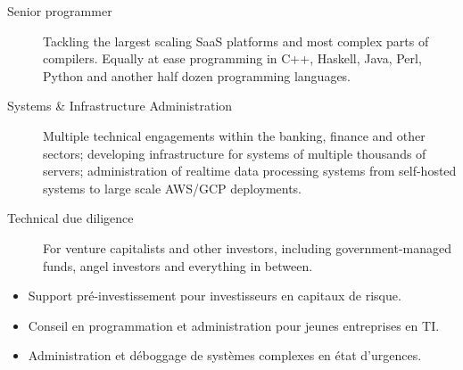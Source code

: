 \vspace{2 mm}

\begin{langen}
\begin{description}%
\item[Senior programmer] Tackling the largest scaling SaaS platforms and most complex parts of compilers. Equally at ease programming in C++, Haskell, Java, Perl, Python and another half dozen programming languages.
\item[Systems \& Infrastructure Administration] Multiple technical engagements within the banking, finance and other sectors; developing infrastructure for systems of multiple thousands of servers; administration of realtime data processing systems from self-hosted systems to large scale AWS/GCP deployments.
\item[Technical due diligence] For venture capitalists and other investors, including government-managed funds, angel investors and everything in between.
\end{description}
\end{langen}
\begin{langfr}
\begin{itemize}%
\item Support pr\'{e}-investissement pour investisseurs en capitaux de risque.
\item Conseil en programmation et administration pour jeunes entreprises en TI.
\item Administration et d\'{e}boggage de syst\`{e}mes complexes en \'{e}tat d'urgences.
\end{itemize}
\end{langfr}

\vspace{2 mm}

